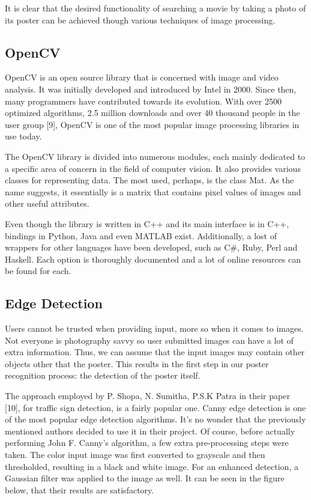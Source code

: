 \documentclass[12pt,a4paper,twoside]{report}
\begin{document}
It is clear that the desired functionality of searching a movie by taking a photo of its poster can be achieved  though various techniques of image processing. 

\subsection{OpenCV}

OpenCV is an open source library that is concerned with image and video analysis. It was initially developed and introduced by Intel in 2000. Since then, many programmers have contributed towards its evolution.  With over 2500 optimized algorithms, 2.5 million downloads and over 40 thousand people in the user group [9], OpenCV is one of the most popular image processing libraries in use today.

The OpenCV library is divided into numerous modules, each mainly dedicated to a specific area of concern in the field of computer vision. It also provides various classes for representing data. The most used, perhaps, is the class Mat. As the name suggests, it essentially is a matrix that contains pixel values of images and other useful attributes.

Even though the library is written in C++ and its main interface is in C++, bindings in Python, Java and even MATLAB exist. Additionally, a lost of wrappers for other languages have been developed, such as C\#, Ruby, Perl and Haskell. Each option is thoroughly documented and a lot of online resources can be found for each.

\subsection{Edge Detection}

Users cannot be trusted when providing input, more so when it comes to images. Not everyone is photography savvy so user submitted images can have a lot of extra information. Thus, we can assume that the input images may contain other objects other that the poster. This results in the first step in our poster recognition process: the detection of the poster itself.

The approach employed by P. Shopa, N. Sumitha, P.S.K Patra in their paper [10], for traffic sign detection, is a fairly popular one. Canny edge detection is one of the most popular edge detection algorithms. It's no wonder that the previously mentioned authors decided to use it in their project. Of course, before actually performing John F. Canny's algorithm, a few extra pre-processing steps were taken. The color input image was first converted to grayscale and then thresholded, resulting in a black and white image. For an enhanced detection, a Gaussian filter was applied to the image as well. It can be seen in the figure below, that their results are satisfactory.
\end{document}
